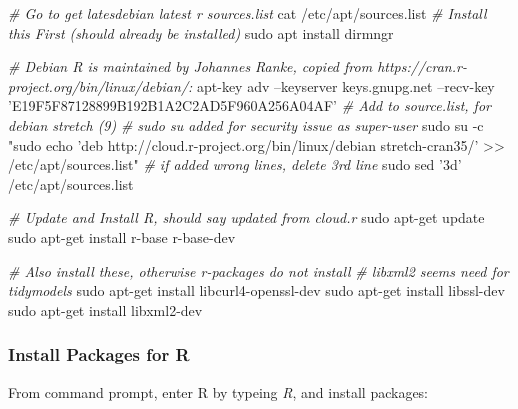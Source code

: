 \documentclass[]{article}
\newenvironment{Shaded}{\begin{snugshade}}{\end{snugshade}}
\newcommand{\CommentTok}[1]{\textcolor[rgb]{0.56,0.35,0.01}{\textit{#1}}}
\newcommand{\ExtensionTok}[1]{#1}
\newcommand{\FunctionTok}[1]{\textcolor[rgb]{0.00,0.00,0.00}{#1}}
\newcommand{\NormalTok}[1]{#1}
\newcommand{\StringTok}[1]{\textcolor[rgb]{0.31,0.60,0.02}{#1}}
\begin{document}
\begin{Shaded}
\begin{Highlighting}[]
\CommentTok{# Go to get latesdebian latest r sources.list}
\FunctionTok{cat}\NormalTok{ /etc/apt/sources.list}
\CommentTok{# Install this First (should already be installed)}
\FunctionTok{sudo}\NormalTok{ apt install dirmngr}

\CommentTok{# Debian R is maintained by Johannes Ranke, copied from https://cran.r-project.org/bin/linux/debian/:}
\ExtensionTok{apt-key}\NormalTok{ adv --keyserver keys.gnupg.net --recv-key }\StringTok{'E19F5F87128899B192B1A2C2AD5F960A256A04AF'}
\CommentTok{# Add to source.list, for debian stretch (9)}
\CommentTok{# sudo su added for security issue as super-user}
\FunctionTok{sudo}\NormalTok{ su -c }\StringTok{"sudo echo 'deb http://cloud.r-project.org/bin/linux/debian stretch-cran35/' >> /etc/apt/sources.list"}
\CommentTok{# if added wrong lines, delete 3rd line}
\FunctionTok{sudo}\NormalTok{ sed }\StringTok{'3d'}\NormalTok{ /etc/apt/sources.list}

\CommentTok{# Update and Install R, should say updated from cloud.r}
\FunctionTok{sudo}\NormalTok{ apt-get update}
\FunctionTok{sudo}\NormalTok{ apt-get install r-base r-base-dev}

\CommentTok{# Also install these, otherwise r-packages do not install}
\CommentTok{# libxml2 seems need for tidymodels}
\FunctionTok{sudo}\NormalTok{ apt-get install libcurl4-openssl-dev}
\FunctionTok{sudo}\NormalTok{ apt-get install libssl-dev}
\FunctionTok{sudo}\NormalTok{ apt-get install libxml2-dev}
\end{Highlighting}
\end{Shaded}

\hypertarget{install-packages-for-r}{%
\subsubsection{Install Packages for R}\label{install-packages-for-r}}

From command prompt, enter R by typeing \emph{R}, and install packages:
\end{document}
